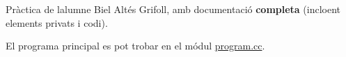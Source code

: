 Pràctica de l\textquotesingle{}alumne Biel Altés Grifoll, amb documentació {\bfseries{ completa}} (incloent elements privats i codi).

El programa principal es pot trobar en el módul \mbox{\hyperlink{program_8cc}{program.\+cc}}. 